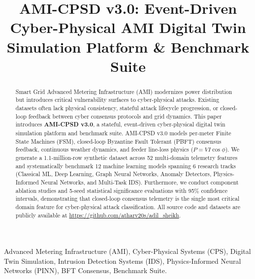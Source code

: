 \documentclass[conference]{IEEEtran}
\begin{document}
\title{AMI-CPSD v3.0: Event-Driven Cyber-Physical AMI Digital Twin Simulation Platform \& Benchmark Suite}

\author{
}

\maketitle

\begin{abstract}
Smart Grid Advanced Metering Infrastructure (AMI) modernizes power distribution but introduces critical vulnerability surfaces to cyber-physical attacks. Existing datasets often lack physical consistency, stateful attack lifecycle progression, or closed-loop feedback between cyber consensus protocols and grid dynamics. This paper introduces \textbf{AMI-CPSD v3.0}, a stateful, event-driven cyber-physical digital twin simulation platform and benchmark suite. AMI-CPSD v3.0 models per-meter Finite State Machines (FSM), closed-loop Byzantine Fault Tolerant (PBFT) consensus feedback, continuous weather dynamics, and feeder line-loss physics ($P = V I \cos\phi$). We generate a 1.1-million-row synthetic dataset across 52 multi-domain telemetry features and systematically benchmark 12 machine learning models spanning 6 research tracks (Classical ML, Deep Learning, Graph Neural Networks, Anomaly Detectors, Physics-Informed Neural Networks, and Multi-Task IDS). Furthermore, we conduct component ablation studies and 5-seed statistical significance evaluations with 95\% confidence intervals, demonstrating that closed-loop consensus telemetry is the single most critical domain feature for cyber-physical attack classification. All source code and datasets are publicly available at \url{https://github.com/atharv20s/adil_sheikh}.
\end{abstract}

\begin{IEEEkeywords}
Advanced Metering Infrastructure (AMI), Cyber-Physical Systems (CPS), Digital Twin Simulation, Intrusion Detection Systems (IDS), Physics-Informed Neural Networks (PINN), BFT Consensus, Benchmark Suite.
\end{IEEEkeywords}
\end{document}
